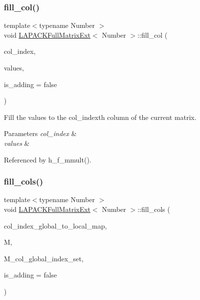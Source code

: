 \subsubsection{\texorpdfstring{fill\+\_\+col()}{fill\_col()}}
{\footnotesize\ttfamily template$<$typename Number $>$ \\
void \hyperlink{classLAPACKFullMatrixExt}{L\+A\+P\+A\+C\+K\+Full\+Matrix\+Ext}$<$ Number $>$\+::fill\+\_\+col (\begin{DoxyParamCaption}\item[{const \hyperlink{classLAPACKFullMatrixExt_a5cf5f4a6104dc17029210b5ca52bf574}{size\+\_\+type}}]{col\+\_\+index,  }\item[{const Vector$<$ Number $>$ \&}]{values,  }\item[{const bool}]{is\+\_\+adding = {\ttfamily false} }\end{DoxyParamCaption})}

Fill the {\ttfamily values} to the {\ttfamily col\+\_\+index\textquotesingle{}th} column of the current matrix. 
\begin{DoxyParams}{Parameters}
{\em col\+\_\+index} & \\
\hline
{\em values} & \\
\hline
\end{DoxyParams}


Referenced by h\+\_\+f\+\_\+mmult().

\mbox{\label{classLAPACKFullMatrixExt_af988edbf2f192f0eddf542178755eb91}} 
\subsubsection{\texorpdfstring{fill\+\_\+cols()}{fill\_cols()}}
{\footnotesize\ttfamily template$<$typename Number $>$ \\
void \hyperlink{classLAPACKFullMatrixExt}{L\+A\+P\+A\+C\+K\+Full\+Matrix\+Ext}$<$ Number $>$\+::fill\+\_\+cols (\begin{DoxyParamCaption}\item[{const std\+::map$<$ types\+::global\+\_\+dof\+\_\+index, size\+\_\+t $>$ \&}]{col\+\_\+index\+\_\+global\+\_\+to\+\_\+local\+\_\+map,  }\item[{const \hyperlink{classLAPACKFullMatrixExt}{L\+A\+P\+A\+C\+K\+Full\+Matrix\+Ext}$<$ Number $>$ \&}]{M,  }\item[{const std\+::vector$<$ types\+::global\+\_\+dof\+\_\+index $>$ \&}]{M\+\_\+col\+\_\+global\+\_\+index\+\_\+set,  }\item[{const bool}]{is\+\_\+adding = {\ttfamily false} }\end{DoxyParamCaption})}

